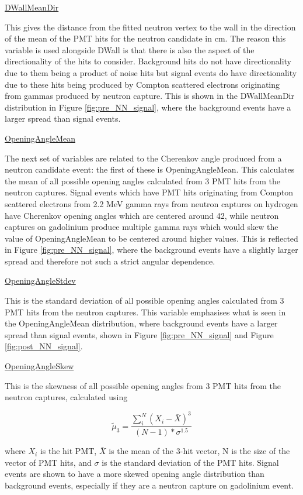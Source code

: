 \underline{DWallMeanDir}

This gives the distance from the fitted neutron vertex to the wall in the direction of the mean of the PMT hits for the neutron candidate in cm. The reason this variable is used alongside DWall is that there is also the aspect of the directionality of the hits to consider. Background hits do not have directionality due to them being a product of noise hits but signal events do have directionality due to these hits being produced by Compton scattered electrons originating from gammas produced by neutron capture. This is shown in the DWallMeanDir distribution in Figure \ref{fig:pre_NN_signal}, where the background events have a larger spread than signal events.

\underline{OpeningAngleMean}

The next set of variables are related to the Cherenkov angle produced from a neutron candidate event: the first of these is OpeningAngleMean. This calculates the mean of all possible opening angles calculated from 3 PMT hits from the neutron captures. Signal events which have PMT hits originating from Compton scattered electrons from 2.2 MeV gamma rays from neutron captures on hydrogen have Cherenkov opening angles which are centered around 42\degree, while neutron captures on gadolinium produce multiple gamma rays which would skew the value of OpeningAngleMean to be centered around higher values. This is reflected in Figure \ref{fig:pre_NN_signal}, where the background events have a slightly larger spread and therefore not such a strict angular dependence.

\underline{OpeningAngleStdev}

This is the standard deviation of all possible opening angles calculated from 3 PMT hits from the neutron captures. This variable emphasises what is seen in the OpeningAngleMean distribution, where background events have a larger spread than signal events, shown in Figure \ref{fig:pre_NN_signal} and Figure \ref{fig:post_NN_signal}. 

\underline{OpeningAngleSkew}

This is the skewness of all possible opening angles from 3 PMT hits from the neutron captures, calculated using

\begin{equation}
    \tilde{\mu}_3=\frac{\sum_i^N\left(X_i-\bar{X}\right)^3}{(N-1) * \sigma^{1.5}}
\end{equation}

where $X_{i}$ is the hit PMT, $\bar{X}$ is the mean of the 3-hit vector, N is the size of the vector of PMT hits, and $\sigma$ is the standard deviation of the PMT hits. Signal events are shown to have a more skewed opening angle distribution than background events, especially if they are a neutron capture on gadolinium event.

